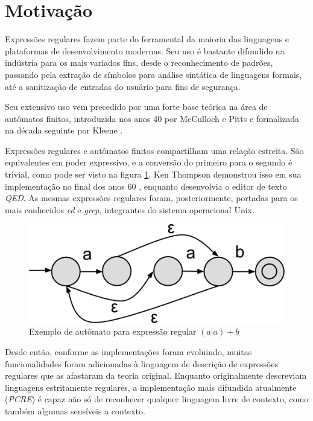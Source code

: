 \documentclass[a4paper,12pt,oneside,onecolumn]{uerj}
\begin{document}
\section{Motivação}

Expressões regulares fazem parte do ferramental da maioria das linguagens e plataformas de desenvolvimento modernas. Seu uso é bastante difundido na indústria para os mais variados fins, desde o reconhecimento de padrões, passando pela extração de símbolos para análise sintática de linguagens formais, até a sanitização de entradas do usuário para fins de segurança.

Seu extensivo uso vem precedido por uma forte base teórica na área de autômatos finitos, introduzida nos anos 40 por McCulloch e Pitts \cite{bib:McCulloch43} e formalizada na década seguinte por Kleene \cite{bib:Kleene56}.

Expressões regulares e autômatos finitos compartilham uma relação estreita. São equivalentes em poder expressivo, e a conversão do primeiro para o segundo é trivial, como pode ser visto na figura \ref{fig:exemplo_automato}. Ken Thompson demonstrou isso em sua implementação no final dos anos 60 \cite{bib:Thompson68}, enquanto desenvolvia o editor de texto \emph{QED}. As mesmas expressões regulares foram, posteriormente, portadas para os mais conhecidos \emph{ed} e \emph{grep}, integrantes do sistema operacional Unix.

\begin{figure}[ht]
  \centering
  \includegraphics[scale=0.3]{figures/exemplo_automato.png}
  \caption{Exemplo de autômato para expressão regular $(a|a)+b$}
  \label{fig:exemplo_automato}
\end{figure}

Desde então, conforme as implementações foram evoluindo, muitas funcionalidades foram adicionadas à linguagem de descrição de expressões regulares que as afastaram da teoria original. Enquanto originalmente descreviam linguagens estritamente regulares, a implementação mais difundida atualmente (\emph{PCRE}) é capaz não só de reconhecer qualquer linguagem livre de contexto, como também algumas sensíveis a contexto. \cite{bib:Nikita12}
\end{document}
